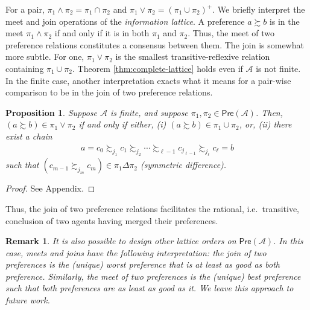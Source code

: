 \documentclass[conference]{ieeeconf}
\newcommand{\A}{\mathcal{A}}
\newcommand{\Pref}{\mathsf{Pre}}
\newcommand{\prefers}{\succsim}
\newcommand{\join}{\vee}
\newcommand{\meet}{\wedge}
\newtheorem{proposition}{Proposition}
\newtheorem{remark}{Remark}
\begin{document}
For a pair, $\pi_1 \meet \pi_2 = \pi_1 \cap \pi_2$ and $\pi_1 \join \pi_2 = \left( \pi_1 \cup \pi_2 \right)^{+}$. We briefly interpret the meet and join operations of the \emph{information lattice}. A preference $a \prefers b$ is in the meet $\pi_1 \meet \pi_2$ if and only if it is in both $\pi_1$ and $\pi_2$. Thus, the meet of two preference relations constitutes a consensus between them. The join is somewhat more subtle. For one, $\pi_1 \join \pi_2$ is the smallest transitive-reflexive relation containing $\pi_1 \cup \pi_2$. Theorem \ref{thm:complete-lattice} holds even if $\A$ is not finite. In the finite case, another interpretation exacts what it means for a pair-wise comparison to be in the join of two preference relations.
\begin{proposition} \label{prop:join}
    Suppose $\A$ is finite, and suppose $\pi_1, \pi_2 \in \Pref(\A)$. Then, $(a \prefers b) \in \pi_1 \join \pi_2$ if and only if either, (i) $(a \prefers b) \in \pi_1 \cup \pi_2$, or, (ii) there exist a chain
    \begin{align}
        a = c_0 \prefers_{j_1} c_1 \prefers_{j_2}  \cdots \prefers_{\ell-1} c_{j_{\ell-1}} \prefers_{j_\ell} c_{\ell} = b \label{eq:chain}
    \end{align}
    such that $\left( c_{m-1} \prefers_{{j_m}} c_{m} \right) \in \pi_1 \Delta \pi_2$ (symmetric difference).
\end{proposition}
\begin{proof}
    See Appendix.
\end{proof}

Thus, the join of two preference relations facilitates the rational, i.e.~transitive, conclusion of two agents having merged their preferences.

\begin{remark}
    It is also possible to design other lattice orders on $\Pref(\A)$. In this case, meets and joins have the following interpretation: the join of two preferences is the (unique) worst preference that is at least as good as both preference. Similarly, the meet of two preferences is the (unique) best preference such that both preferences are as least as good as it. We leave this approach to future work.
\end{remark}
\end{document}
